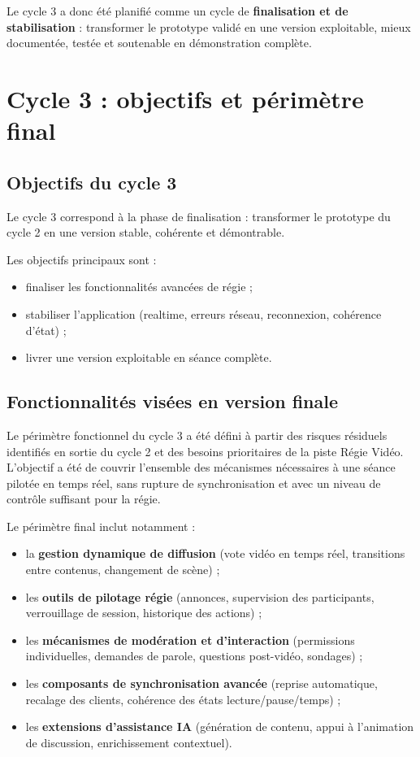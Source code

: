 \documentclass[11pt,a4paper]{report}
\begin{document}
Le cycle 3 a donc été planifié comme un cycle de \textbf{finalisation et de stabilisation} : transformer le prototype validé en une version exploitable, mieux documentée, testée et soutenable en démonstration complète.

\chapter{Cycle 3 : objectifs et périmètre final}
\section{Objectifs du cycle 3}
Le cycle 3 correspond à la phase de finalisation : transformer le prototype du cycle 2 en une version stable, cohérente et démontrable.

Les objectifs principaux sont :
\begin{itemize}
    \item finaliser les fonctionnalités avancées de régie ;
    \item stabiliser l'application (realtime, erreurs réseau, reconnexion, cohérence d'état) ;
    \item livrer une version exploitable en séance complète.
\end{itemize}

\section{Fonctionnalités visées en version finale}
Le périmètre fonctionnel du cycle 3 a été défini à partir des risques résiduels identifiés en sortie du cycle 2 et des besoins prioritaires de la piste Régie Vidéo. L'objectif a été de couvrir l'ensemble des mécanismes nécessaires à une séance pilotée en temps réel, sans rupture de synchronisation et avec un niveau de contrôle suffisant pour la régie.

Le périmètre final inclut notamment :
\begin{itemize}
    \item la \textbf{gestion dynamique de diffusion} (vote vidéo en temps réel, transitions entre contenus, changement de scène) ;
    \item les \textbf{outils de pilotage régie} (annonces, supervision des participants, verrouillage de session, historique des actions) ;
    \item les \textbf{mécanismes de modération et d'interaction} (permissions individuelles, demandes de parole, questions post-vidéo, sondages) ;
    \item les \textbf{composants de synchronisation avancée} (reprise automatique, recalage des clients, cohérence des états lecture/pause/temps) ;
    \item les \textbf{extensions d'assistance IA} (génération de contenu, appui à l'animation de discussion, enrichissement contextuel).
\end{itemize}
\end{document}

